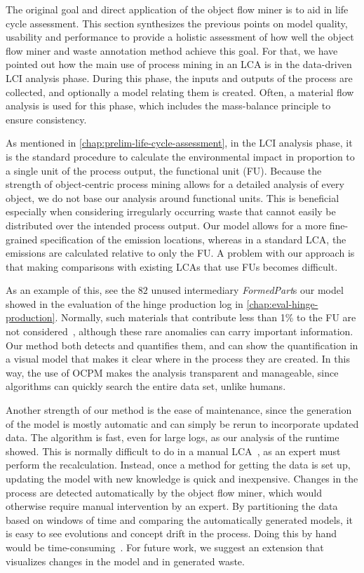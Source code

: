 The original goal and direct application of the object flow miner is to aid in life cycle assessment.
This section synthesizes the previous points on model quality, usability and performance to provide a holistic assessment of how well the object flow miner and waste annotation method achieve this goal.
For that, we have pointed out how the main use of process mining in an LCA is in the data-driven LCI analysis phase.
During this phase, the inputs and outputs of the process are collected, and optionally a model relating them is created.
Often, a material flow analysis is used for this phase, which includes the mass-balance principle to ensure consistency.



As mentioned in \cref{chap:prelim-life-cycle-assessment}, in the LCI analysis phase, it is the standard procedure to calculate the environmental impact in proportion to a single unit of the process output, the functional unit (FU).
Because the strength of object-centric process mining allows for a detailed analysis of every object, we do not base our analysis around functional units. 
This is beneficial especially when considering irregularly occurring waste that cannot easily be distributed over the intended process output.
Our model allows for a more fine-grained specification of the emission locations, whereas in a standard LCA, the emissions are calculated relative to only the FU.
A problem with our approach is that making comparisons with existing LCAs that use FUs becomes difficult.



As an example of this, see the $82$ unused intermediary \emph{FormedPart}s our model showed in the evaluation of the hinge production log in \cref{chap:eval-hinge-production}.
Normally, such materials that contribute less than 1\% to the FU are not considered~\autocite{grahl}, although these rare anomalies can carry important information.
Our method both detects and quantifies them, and can show the quantification in a visual model that makes it clear where in the process they are created.
In this way, the use of OCPM makes the analysis transparent and manageable, since algorithms can quickly search the entire data set, unlike humans.



Another strength of our method is the ease of maintenance, since the generation of the model is mostly automatic and can simply be rerun to incorporate updated data.
The algorithm is fast, even for large logs, as our analysis of the runtime showed.
This is normally difficult to do in a manual LCA~\autocite{ortmeier2021}, as an expert must perform the recalculation.
Instead, once a method for getting the data is set up, updating the model with new knowledge is quick and inexpensive.
Changes in the process are detected automatically by the object flow miner, which would otherwise require manual intervention by an expert.
By partitioning the data based on windows of time and comparing the automatically generated models, it is easy to see evolutions and concept drift in the process.
Doing this by hand would be time-consuming~\autocite{ortmeier2021}.
For future work, we suggest an extension that visualizes changes in the model and in generated waste.



